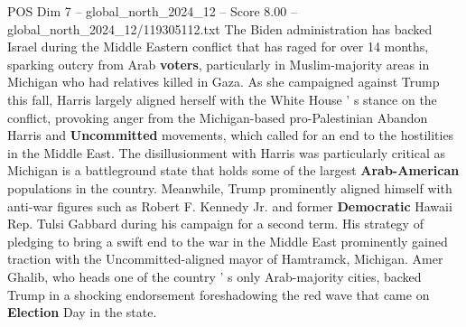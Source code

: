 \begin{textsample}{POS Dim 7 – global\_north\_2024\_12 – Score 8.00 – global\_north\_2024\_12/119305112.txt}
The Biden administration has backed Israel during the Middle Eastern conflict that has raged for over 14 months, sparking outcry from Arab \textbf{voters}, particularly in Muslim-majority areas in Michigan who had relatives killed in Gaza.
As she campaigned against Trump this fall, Harris largely aligned herself with the White House ' s stance on the conflict, provoking anger from the Michigan-based pro-Palestinian Abandon Harris and \textbf{Uncommitted} movements, which called for an end to the hostilities in the Middle East.
The disillusionment with Harris was particularly critical as Michigan is a battleground state that holds some of the largest \textbf{Arab-American} populations in the country.
Meanwhile, Trump prominently aligned himself with anti-war figures such as Robert F.
Kennedy Jr. and former \textbf{Democratic} Hawaii Rep.
Tulsi Gabbard during his campaign for a second term.
His strategy of pledging to bring a swift end to the war in the Middle East prominently gained traction with the Uncommitted-aligned mayor of Hamtramck, Michigan.
Amer Ghalib, who heads one of the country ' s only Arab-majority cities, backed Trump in a shocking endorsement foreshadowing the red wave that came on \textbf{Election} Day in the state.

\end{textsample}
